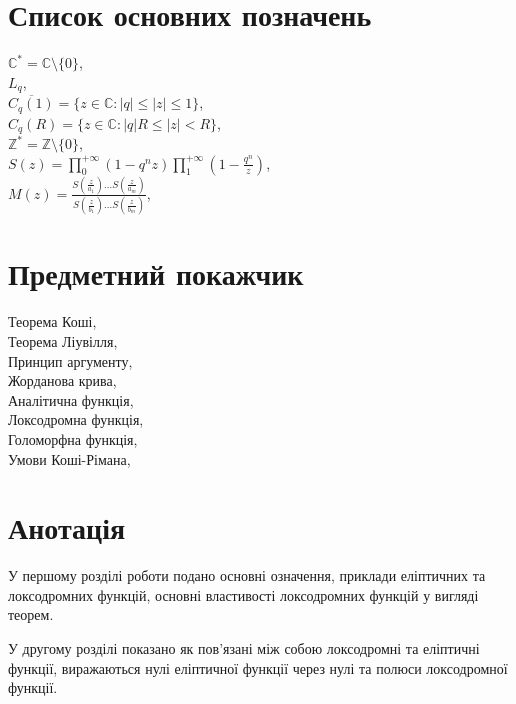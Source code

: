 \documentclass[12pt,a4paper]{article}
\begin{document}
\section{Список основних позначень}
$\mathbb{C}^{*}=\mathbb{C}\setminus\lbrace 0 \rbrace$, ~\pageref{Cstar}\\
$L_{q}$, ~\\
$\overline{C_{q}(1)}=\lbrace z\in \mathbb{C}: \vert q\vert\leq\vert z\vert\leq 1\rbrace$,  ~\\
$C_{q}(R)=\lbrace z\in \mathbb{C}:\left |q  \right |R\leq \left |z  \right |<R \rbrace$, ~\\
$\mathbb{Z}^{*}=\mathbb{Z}\setminus \lbrace 0 \rbrace$,  ~ \\
$S(z)= \prod\limits_{0}^{+\infty } ( 1-q^{n}z ) \prod\limits_{1}^{+\infty }( 1-\frac{q^{n}}{z})$, 
~\pageref{S(z)}\\
$ M(z)=\frac{S(\frac{z}{a_{1}})...S(\frac{z}{a_{m}})}{S(\frac{z}{b_{1}})...S(\frac{z}{b_{m}})}$, ~\pageref{M(z)}



\section{Предметний покажчик}
Теорема Коші, ~\pageref{thKoshi}\\
Теорема Ліувілля, ~\pageref{thLiuv}\\
Принцип аргументу, ~\pageref{prArg}\\
Жорданова крива, ~\pageref{GordKryva}\\
Аналітична функція, ~\pageref{analitFun}\\
Локсодромна функція, ~\pageref{loxodrFun}\\
Голоморфна функція, ~\pageref{holomFun}\\
Умови Коші-Рімана, ~\pageref{KoshiRimana}\\



\clearpage
\section{Анотація}

У першому розділі роботи подано основні означення, приклади
еліптичних та локсодромних функцій, основні властивості
локсодромних функцій у вигляді теорем.

У другому розділі показано як пов'язані між собою локсодромні та
еліптичні функції, виражаються нулі еліптичної функції через нулі
та полюси локсодромної функції.
\end{document}
